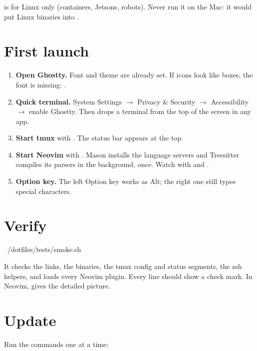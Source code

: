 \begin{warning}
 is for Linux only (containers, Jetsons, robots). Never run it on the
Mac: it would put Linux binaries into .
\end{warning}

\section{First launch}

\begin{enumerate}
  \item \textbf{Open Ghostty.} Font and theme are already set. If icons look like boxes, the font
        is missing: .
  \item \textbf{Quick terminal.} System Settings \(\rightarrow\) Privacy \& Security \(\rightarrow\)
        Accessibility \(\rightarrow\) enable Ghostty. Then  drops a terminal from the top
        of the screen in any app.
  \item \textbf{Start tmux} with . The status bar appears at the top.
  \item \textbf{Start Neovim} with . Mason installs the language servers and Treesitter
        compiles its parsers in the background, once. Watch with  and .
  \item \textbf{Option key.} The left Option key works as Alt; the right one still types special
        characters.
\end{enumerate}

\section{Verify}

\begin{shell}
~/dotfiles/tests/smoke.sh
\end{shell}

It checks the links, the binaries, the tmux config and status segments, the zsh helpers, and loads
every Neovim plugin. Every line should show a check mark. In Neovim,  gives the
detailed picture.

\section{Update}

Run the commands one at a time:

